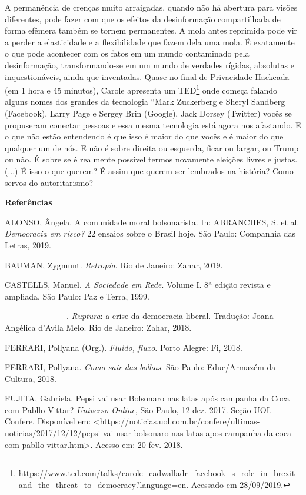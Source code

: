 A permanência de crenças muito arraigadas, quando não há abertura para
visões diferentes, pode fazer com que os efeitos da desinformação
compartilhada de forma efêmera também se tornem permanentes. A mola
antes reprimida pode vir a perder a elasticidade e a flexibilidade que
fazem dela uma mola. É exatamente o que pode acontecer com os fatos em
um mundo contaminado pela desinformação, transformando-se em um mundo de
verdades rígidas, absolutas e inquestionáveis, ainda que inventadas.
Quase no final de Privacidade Hackeada (em 1 hora e 45 minutos), Carole
apresenta um TED\footnote{\url{https://www.ted.com/talks/carole_cadwalladr_facebook_s_role_in_brexit_and_the_threat_to_democracy?language=en}.
  Acessado em 28/09/2019.} onde começa falando alguns nomes dos grandes
da tecnologia ``Mark Zuckerberg e Sheryl Sandberg (Facebook), Larry Page
e Sergey Brin (Google), Jack Dorsey (Twitter) vocês se propuseram
conectar pessoas e essa mesma tecnologia está agora nos afastando. E o
que não estão entendendo é que isso é maior do que vocês e é maior do
que qualquer um de nós. E não é sobre direita ou esquerda, ficar ou
largar, ou Trump ou não. É sobre se é realmente possível termos
novamente eleições livres e justas. (...) É isso o que querem? É assim
que querem ser lembrados na história? Como servos do autoritarismo?

\textbf{Referências}

ALONSO, Ângela. A comunidade moral bolsonarista. In: ABRANCHES, S. et
al. \emph{Democracia em risco?} 22 ensaios sobre o Brasil hoje. São
Paulo: Companhia das Letras, 2019.

BAUMAN, Zygmunt. \emph{Retropia}. Rio de Janeiro: Zahar, 2019.

CASTELLS, Manuel. \emph{A Sociedade em Rede}. Volume I. 8ª edição
revista e ampliada. São Paulo: Paz e Terra, 1999.

\_\_\_\_\_\_\_\_\_\_. \emph{Ruptura}: a crise da democracia liberal.
Tradução: Joana Angélica d'Avila Melo. Rio de Janeiro: Zahar, 2018.

FERRARI, Pollyana (Org.). \emph{Fluido, fluxo}. Porto Alegre: Fi, 2018.

FERRARI, Pollyana. \emph{Como sair das bolhas}. São Paulo: Educ/Armazém
da Cultura, 2018.

FUJITA, Gabriela. Pepsi vai usar Bolsonaro nas latas após campanha da
Coca com Pabllo Vittar? \emph{Universo Online}, São Paulo, 12 dez. 2017.
Seção UOL Confere. Disponível em:
\textless{}https://noticias.uol.com.br/confere/ultimas-noticias/2017/12/12/pepsi-vai-usar-bolsonaro-nas-latas-apos-campanha-da-coca-com-pabllo-vittar.htm\textgreater{}.
Acesso em: 20 fev. 2018.

